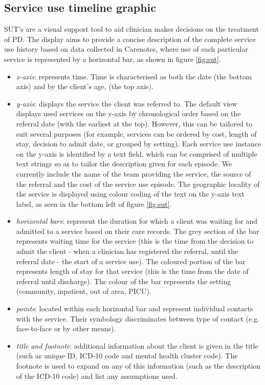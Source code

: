 \documentclass{article}
\begin{document}
\subsection{Service use timeline graphic}
SUT’s are a visual support tool to aid clinician makes decisions on the treatment of PD. The display aims to provide a concise description of the complete service use history based on data collected in Carenotes, where use of each particular service is represented by a horizontal bar, as shown in figure \ref{fig:sut}. 
\begin{itemize}
	\item \emph{x-axis}: represents time. Time is characterised as both the date (the bottom axis) and by the client’s age, (the top axis). 
	\item \emph{y-axis}: displays the service the client was referred to. The default view displays used services on the y-axis by chronological order based on the referral date (with the earliest at the top). However, this can be tailored to suit several purposes (for example, services can be ordered by cost, length of stay, decision to admit date, or grouped by setting). Each service use instance on the y-axis is identified by a text field, which can be comprised of multiple text strings so as to tailor the description given for each episode. We currently include the name of the team providing the service, the source of the referral and the cost of the service use episode. The geographic locality of the service is displayed using colour coding of the text on the y-axis text label, as seen in the bottom left of figure \ref{fig:sut}.
	\item \emph{horizontal bars}: represent the duration for which a client was waiting for and admitted to a service based on their   care records. The grey section of the bar represents waiting time for the service (this is the time from the decision to admit the client - when a clinician has registered the referral, until the referral date - the start of a service use). The coloured portion of the bar represents length of stay for that service (this is the time from the date of referral until discharge). The colour of the bar represents the setting (community, inpatient, out of area, PICU). 
	\item \emph{points}: located within each horizontal bar and represent individual contacts with the service. Their symbology discriminates between type of contact (e.g. face-to-face or by other means).
	\item \emph{title and footnote}: additional information about the client is given in the title (such as unique ID, ICD-10 code and mental health cluster code). The footnote is used to expand on any of this information (such as the description of the ICD-10 code) and list any assumptions used.
\end{itemize}
\end{document}

